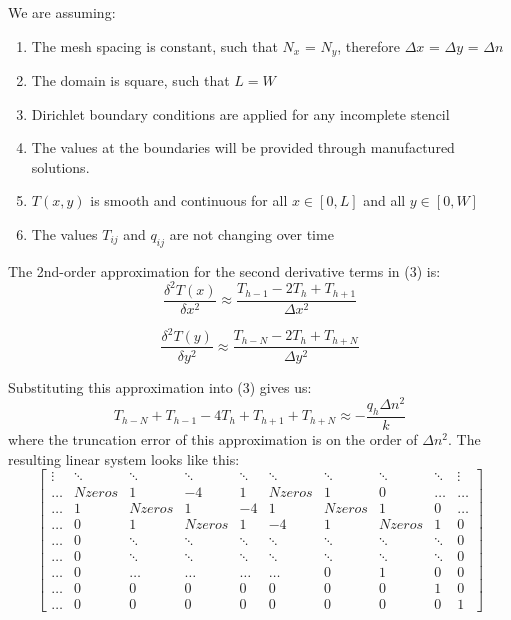 \documentclass[letterpaper, 12pt]{article}
\begin{document}
\begin{flushleft}
\begin{tikzpicture}[
dot/.style = {circle, fill=black,inner sep=1pt, minimum size=4pt,label={#1},name=#1},
every label/.append style = {inner sep=1pt},thick]
\end{tikzpicture}
\vskip 5mm
We are assuming:
\begin{enumerate}
    \item The mesh spacing is constant, such that $N_x$ = $N_y$, therefore $\Delta x$ = $\Delta y$ = $\Delta n$
    \item The domain is square, such that $L=W$
    \item Dirichlet boundary conditions are applied for any incomplete stencil
    \item The values at the boundaries will be provided through manufactured solutions. 
    \item $T(x,y)$ is smooth and continuous for all $x \in [0,L]$ and all $y \in [0,W]$
    \item The values $T_{ij}$ and $q_{ij}$ are not changing over time
\end{enumerate}
\vskip 5mm
The 2nd-order approximation for the second derivative terms in (3) is:
\begin{equation}
    \frac{\delta^2 T(x)}{\delta x^2} \approx \frac{T_{h-1} - 2T_h + T_{h+1}}{\Delta x^2}
\end{equation}

\begin{equation}
    \frac{\delta^2 T(y)}{\delta y^2} \approx \frac{T_{h-N} - 2T_h + T_{h+N}}{\Delta y^2}
\end{equation}


Substituting this approximation into (3) gives us:
\begin{equation}
    T_{h-N} + T_{h-1} - 4T_h + T_{h+1} + T_{h+N} \approx - \frac{q_h \Delta n^2}{k}
\end{equation}
where the truncation error of this approximation is on the order of $\Delta n^2$. The resulting linear system looks like this:
\[
\begin{bmatrix}

    \vdots & \ddots & \ddots & \ddots & \ddots & \ddots & \ddots & \ddots & \ddots & \vdots \\
    \hdots & N zeros & 1 & -4 & 1 & N zeros & 1 & 0 & \hdots & \hdots\\
    \hdots & 1 & N zeros & 1 & -4 & 1 & N zeros & 1 & 0 & \hdots \\
    \hdots & 0 & 1 & N zeros & 1 & -4 & 1 & N zeros & 1 &  0\\
    \hdots & 0 & \ddots & \ddots & \ddots & \ddots & \ddots & \ddots & \ddots & 0 \\
    \hdots & 0 & \ddots & \ddots & \ddots & \ddots & \ddots & \ddots & \ddots & 0 \\
    \hdots & 0 & \hdots &  \hdots & \hdots & \hdots & 0 & 1 & 0 & 0\\
    \hdots & 0 & 0 & 0 & 0 & 0 & 0 & 0 & 1 & 0 \\
    \hdots & 0 & 0 & 0 & 0 & 0 & 0 & 0 & 0 & 1
    

\end{bmatrix}\]
\end{flushleft}
\end{document}
